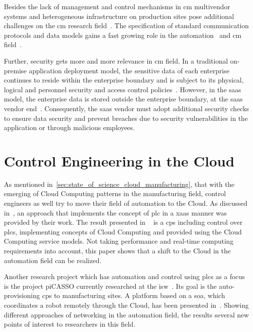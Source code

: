 \documentclass[
a4paper,
twoside,
headsepline,
cleardoublepage=empty,
parskip=half,
draft=false
]{scrbook}
\begin{document}
			Besides the lack of management and control mechanisms in \gls{cm} multivendor systems and heterogeneous infrastructure on production sites pose additional challenges on the \gls{cm} research field~\cite{weyer2015towards}.
			The specification of standard communication protocols and data models gains a fast growing role in the automation~\cite{jazdi2014cyber} and \gls{cm} field~\cite{wollschlaeger2017future}.
			
			Further, security gets more and more relevance in \gls{cm} field.
			In a traditional on-premise application deployment model, the sensitive data of each enterprise continues to reside within the enterprise boundary and is subject to its physical, logical and personnel security and access control policies~\cite{jeschke2017industrial}. 
			However, in the \gls{saas} model, the enterprise data is stored outside the enterprise boundary, at the \gls{saas} vendor end~\cite{subashini2011survey}.
			Consequently, the \gls{saas} vendor must adopt additional security checks to ensure data security and prevent breaches due to security vulnerabilities in the application or through malicious employees.

		\section{Control Engineering in the Cloud}\label{sec:control_engineering_in_the_cloud}

			As mentioned in~\cref{sec:state_of_science_cloud_manufacturing}, that with the emerging of Cloud Computing patterns in the manufacturing field, control engineers as well try to move their field of automation to the Cloud.
			As discussed in~\cite{jazdi2014cyber}, an approach that implements the concept of \gls{plc} in a \gls{xaas} manner was provided by their work. 
			The result presented in ~\cite{jazdi2014cyber} is a \gls{cps} including control over \gls{plc}s, implementing concepts of Cloud Computing and provided using the Cloud Computing service models. 
			Not taking performance and real-time computing requirements into account, this paper shows that a shift to the Cloud in the automation field can be realized.
			
			Another research project which has automation and control using \gls{plc}s as a focus is the project piCASSO currently researched at the \gls{isw}~\cite{kretschmer2016communication}.
			Its goal is the auto-provisioning \gls{cps} to manufacturing sites.
			A platform based on a \gls{soa}, which coordinates a robot remotely through the Cloud, has been presented in~\cite{kretschmer2016communication}. 
			Showing different approaches of networking in the automation field, the results several new points of interest to researchers in this field.
\end{document}
